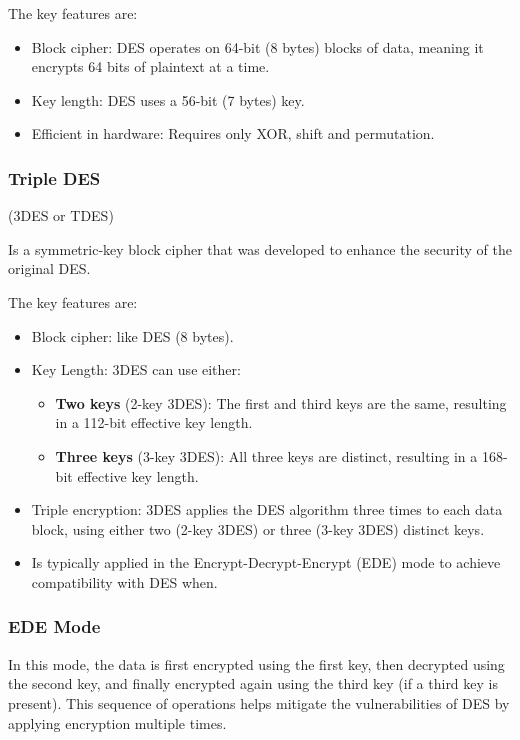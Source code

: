 The key features are:
\begin{itemize}
    \item Block cipher: DES operates on 64-bit (8 bytes) blocks of data, meaning it encrypts 64 bits of plaintext at a time.
    \item Key length: DES uses a 56-bit (7 bytes) key.
    \item Efficient in hardware: Requires only XOR, shift and permutation.
\end{itemize}

\subsubsection{Triple DES}
\begin{center}
    (3DES or TDES)
\end{center}

Is a symmetric-key block cipher that was developed to enhance the security of the original DES.

The key features are:
\begin{itemize}
    \item Block cipher: like DES (8 bytes).
    \item Key Length: 3DES can use either:
    \begin{itemize}
        \item \textbf{Two keys} (2-key 3DES): The first and third keys are the same, resulting in a 112-bit effective key length.
        \item \textbf{Three keys} (3-key 3DES): All three keys are distinct, resulting in a 168-bit effective key length.
    \end{itemize}
    \item Triple encryption: 3DES applies the DES algorithm three times to each data block, using either two (2-key 3DES) or three (3-key 3DES) distinct keys.
    \item Is typically applied in the Encrypt-Decrypt-Encrypt (EDE) mode to achieve compatibility with DES when.
\end{itemize}

\subsubsection*{EDE Mode}
In this mode, the data is first encrypted using the first key, then decrypted using the second key, and finally encrypted again using the third key (if a third key is present). This sequence of operations helps mitigate the vulnerabilities of DES by applying encryption multiple times.

